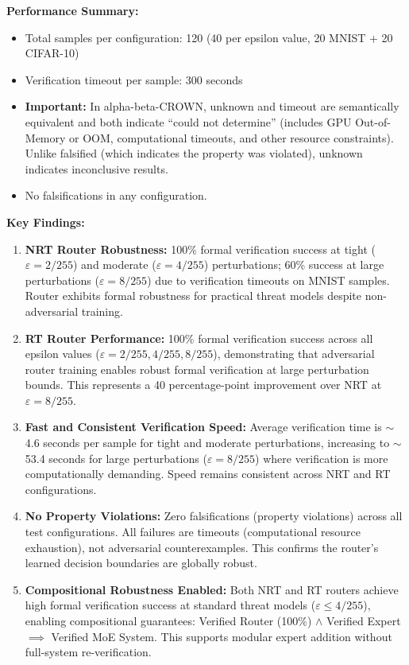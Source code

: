 \documentclass[11pt,a4paper]{article}
\begin{document}
\textbf{Performance Summary:}
\begin{itemize}
    \item Total samples per configuration: 120 (40 per epsilon value, 20 MNIST + 20 CIFAR-10)
    \item Verification timeout per sample: 300 seconds
    \item \textbf{Important:} In alpha-beta-CROWN, unknown and timeout are semantically equivalent and both indicate ``could not determine'' (includes GPU Out-of-Memory or OOM, computational timeouts, and other resource constraints). Unlike falsified (which indicates the property was violated), unknown indicates inconclusive results.
    \item No falsifications in any configuration.
\end{itemize}

\textbf{Key Findings:}
\begin{enumerate}
    \item \textbf{NRT Router Robustness:} 100\% formal verification success at tight ($\varepsilon = 2/255$) and moderate ($\varepsilon = 4/255$) perturbations; 60\% success at large perturbations ($\varepsilon = 8/255$) due to verification timeouts on MNIST samples. Router exhibits formal robustness for practical threat models despite non-adversarial training.

    \item \textbf{RT Router Performance:} 100\% formal verification success across all epsilon values ($\varepsilon = 2/255, 4/255, 8/255$), demonstrating that adversarial router training enables robust formal verification at large perturbation bounds. This represents a 40 percentage-point improvement over NRT at $\varepsilon = 8/255$.

    \item \textbf{Fast and Consistent Verification Speed:} Average verification time is $\sim$4.6 seconds per sample for tight and moderate perturbations, increasing to $\sim$53.4 seconds for large perturbations ($\varepsilon = 8/255$) where verification is more computationally demanding. Speed remains consistent across NRT and RT configurations.

    \item \textbf{No Property Violations:} Zero falsifications (property violations) across all test configurations. All failures are timeouts (computational resource exhaustion), not adversarial counterexamples. This confirms the router's learned decision boundaries are globally robust.

    \item \textbf{Compositional Robustness Enabled:} Both NRT and RT routers achieve high formal verification success at standard threat models ($\varepsilon \leq 4/255$), enabling compositional guarantees: Verified Router (100\%) $\land$ Verified Expert $\implies$ Verified MoE System. This supports modular expert addition without full-system re-verification.
\end{enumerate}
\end{document}

